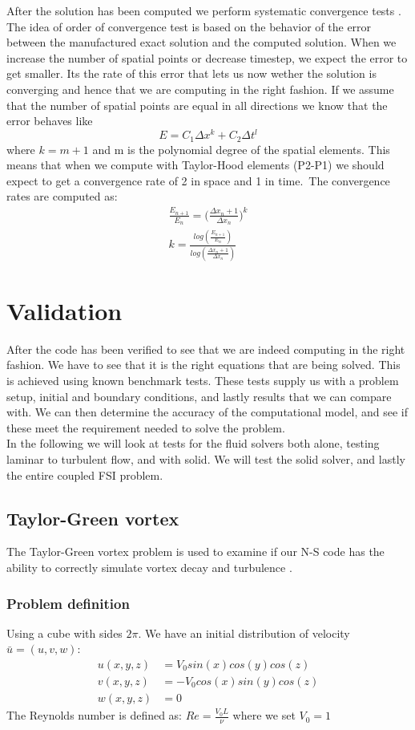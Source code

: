 After the solution has been computed we perform systematic convergence tests \cite{Roache}. The idea of order of convergence test is based on the behavior of the error between the manufactured exact solution and the computed solution. When we increase the number of spatial points or decrease timestep, we expect the error to get smaller. Its the rate of this error that lets us now wether the solution is converging and hence that we are computing in the right fashion.
If we assume that the number of spatial points are equal in all directions we know that the error behaves like
$$ E = C_1 \Delta x^k+ C_2 \Delta t^l $$
where $ k = m+1 $ and m is the polynomial degree of the spatial elements. This means that when we compute with Taylor-Hood elements (P2-P1) we should expect to get a convergence rate of 2 in space and 1 in time.\
The convergence rates are computed as:
\begin{align}
\frac{E_{n+1}}{E_n} = \big( \frac{\Delta x_n+1}{\Delta x_n} \big)^k \\
k = \frac{log( \frac{E_{n+1}}{E_n}) }{ log(\frac{\Delta x_n+1}{\Delta x_n})}
\end{align}





\section{Validation}
After the code has been verified to see that we are indeed computing in the right fashion. We have to see that it is the right equations that are being solved. This is achieved using known benchmark tests. These tests supply us with a problem setup, initial and boundary conditions, and lastly results that we can compare with. We can then determine the accuracy of the computational model, and see if these meet the requirement needed to solve the problem. \cite{Selin2014} \\
In the following we will look at tests for the fluid solvers both alone, testing laminar to turbulent flow, and with solid. We will test the solid solver, and lastly the entire coupled FSI problem. 
\subsection{Taylor-Green vortex}
The Taylor-Green vortex problem is used to examine if our N-S code has the ability to correctly simulate vortex decay and turbulence \cite{DeBonis2013}.
\subsubsection{Problem definition}
Using a cube with sides $2\pi$. \newline
We have an initial distribution of velocity $\bar{u} = (u,v,w)$:
\begin{align}
u(x,y,z) &= V_0sin(x)cos(y)cos(z) \\
v(x,y,z) &= - V_0cos(x)sin(y)cos(z)  \\
w(x,y,z) &= 0  
\end{align}
The Reynolds number is defined as: $Re = \frac{V_0 L}{\nu}$ where we set $V_0 = 1$

